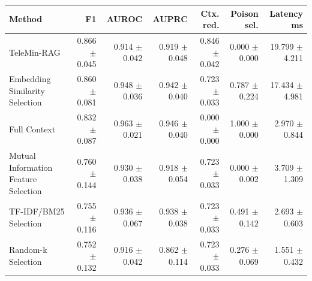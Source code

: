 \begin{tabular}{lrrrrrr}
\toprule
Method & F1 & AUROC & AUPRC & Ctx. red. & Poison sel. & Latency ms \\
\midrule
TeleMin-RAG & 0.866 $\pm$ 0.045 & 0.914 $\pm$ 0.042 & 0.919 $\pm$ 0.048 & 0.846 $\pm$ 0.042 & 0.000 $\pm$ 0.000 & 19.799 $\pm$ 4.211 \\
Embedding Similarity Selection & 0.860 $\pm$ 0.081 & 0.948 $\pm$ 0.036 & 0.942 $\pm$ 0.040 & 0.723 $\pm$ 0.033 & 0.787 $\pm$ 0.224 & 17.434 $\pm$ 4.981 \\
Full Context & 0.832 $\pm$ 0.087 & 0.963 $\pm$ 0.021 & 0.946 $\pm$ 0.040 & 0.000 $\pm$ 0.000 & 1.000 $\pm$ 0.000 & 2.970 $\pm$ 0.844 \\
Mutual Information Feature Selection & 0.760 $\pm$ 0.144 & 0.930 $\pm$ 0.038 & 0.918 $\pm$ 0.054 & 0.723 $\pm$ 0.033 & 0.000 $\pm$ 0.002 & 3.709 $\pm$ 1.309 \\
TF-IDF/BM25 Selection & 0.755 $\pm$ 0.116 & 0.936 $\pm$ 0.067 & 0.938 $\pm$ 0.038 & 0.723 $\pm$ 0.033 & 0.491 $\pm$ 0.142 & 2.693 $\pm$ 0.603 \\
Random-k Selection & 0.752 $\pm$ 0.132 & 0.916 $\pm$ 0.042 & 0.862 $\pm$ 0.114 & 0.723 $\pm$ 0.033 & 0.276 $\pm$ 0.069 & 1.551 $\pm$ 0.432 \\
\bottomrule
\end{tabular}
